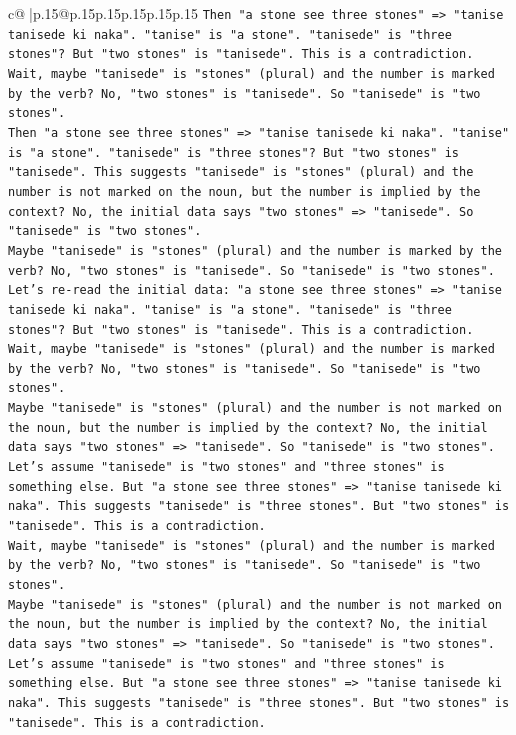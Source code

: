 \documentclass{article}
\begin{document}
{\begin{supertabular}{c@{$\;$}|p{.15\linewidth}@{}p{.15\linewidth}p{.15\linewidth}p{.15\linewidth}p{.15\linewidth}p{.15\linewidth}}
{{{\texttt{Then "a stone see three stones" => "tanise tanisede ki naka". "tanise" is "a stone". "tanisede" is "three stones"? But "two stones" is "tanisede". This is a contradiction.} \\
\texttt{Wait, maybe "tanisede" is "stones" (plural) and the number is marked by the verb? No, "two stones" is "tanisede". So "tanisede" is "two stones".} \\
\texttt{Then "a stone see three stones" => "tanise tanisede ki naka". "tanise" is "a stone". "tanisede" is "three stones"? But "two stones" is "tanisede". This suggests "tanisede" is "stones" (plural) and the number is not marked on the noun, but the number is implied by the context? No, the initial data says "two stones" => "tanisede". So "tanisede" is "two stones".} \\
\texttt{Maybe "tanisede" is "stones" (plural) and the number is marked by the verb? No, "two stones" is "tanisede". So "tanisede" is "two stones".} \\
\texttt{Let's re{-}read the initial data: "a stone see three stones" => "tanise tanisede ki naka". "tanise" is "a stone". "tanisede" is "three stones"? But "two stones" is "tanisede". This is a contradiction.} \\
\texttt{Wait, maybe "tanisede" is "stones" (plural) and the number is marked by the verb? No, "two stones" is "tanisede". So "tanisede" is "two stones".} \\
\texttt{Maybe "tanisede" is "stones" (plural) and the number is not marked on the noun, but the number is implied by the context? No, the initial data says "two stones" => "tanisede". So "tanisede" is "two stones".} \\
\texttt{Let's assume "tanisede" is "two stones" and "three stones" is something else. But "a stone see three stones" => "tanise tanisede ki naka". This suggests "tanisede" is "three stones". But "two stones" is "tanisede". This is a contradiction.} \\
\texttt{Wait, maybe "tanisede" is "stones" (plural) and the number is marked by the verb? No, "two stones" is "tanisede". So "tanisede" is "two stones".} \\
\texttt{Maybe "tanisede" is "stones" (plural) and the number is not marked on the noun, but the number is implied by the context? No, the initial data says "two stones" => "tanisede". So "tanisede" is "two stones".} \\
\texttt{Let's assume "tanisede" is "two stones" and "three stones" is something else. But "a stone see three stones" => "tanise tanisede ki naka". This suggests "tanisede" is "three stones". But "two stones" is "tanisede". This is a contradiction.} \\
}}}
\end{supertabular}}
\end{document}
